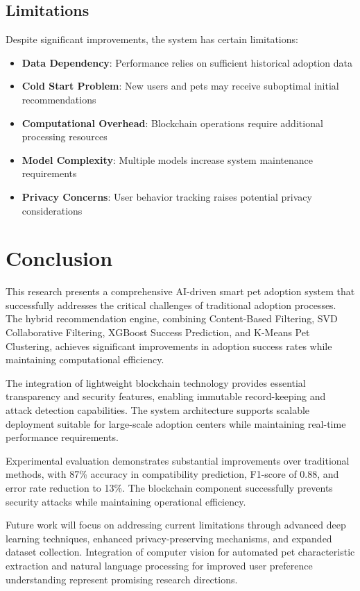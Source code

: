 \documentclass[conference]{IEEEtran}
\begin{document}
\subsection{Limitations}

Despite significant improvements, the system has certain limitations:

\begin{itemize}
\item \textbf{Data Dependency}: Performance relies on sufficient historical adoption data
\item \textbf{Cold Start Problem}: New users and pets may receive suboptimal initial recommendations
\item \textbf{Computational Overhead}: Blockchain operations require additional processing resources
\item \textbf{Model Complexity}: Multiple models increase system maintenance requirements
\item \textbf{Privacy Concerns}: User behavior tracking raises potential privacy considerations
\end{itemize}

\section{Conclusion}

This research presents a comprehensive AI-driven smart pet adoption system that successfully addresses the critical challenges of traditional adoption processes. The hybrid recommendation engine, combining Content-Based Filtering, SVD Collaborative Filtering, XGBoost Success Prediction, and K-Means Pet Clustering, achieves significant improvements in adoption success rates while maintaining computational efficiency.

The integration of lightweight blockchain technology provides essential transparency and security features, enabling immutable record-keeping and attack detection capabilities. The system architecture supports scalable deployment suitable for large-scale adoption centers while maintaining real-time performance requirements.

Experimental evaluation demonstrates substantial improvements over traditional methods, with 87\% accuracy in compatibility prediction, F1-score of 0.88, and error rate reduction to 13\%. The blockchain component successfully prevents security attacks while maintaining operational efficiency.

Future work will focus on addressing current limitations through advanced deep learning techniques, enhanced privacy-preserving mechanisms, and expanded dataset collection. Integration of computer vision for automated pet characteristic extraction and natural language processing for improved user preference understanding represent promising research directions.
\end{document}
